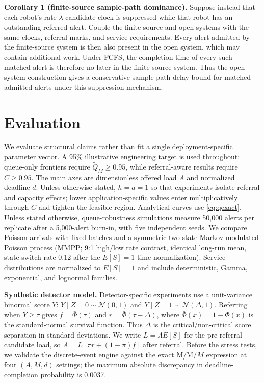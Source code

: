 \documentclass[letterpaper,10pt,conference]{ieeeconf}
\begin{document}
\textbf{Corollary 1 (finite-source sample-path dominance).}
Suppose instead that each robot's rate-$\lambda$ candidate clock is suppressed
while that robot has an outstanding referred alert. Couple the finite-source
and open systems with the same clocks, referral marks, and service requirements.
Every alert admitted by the finite-source system is then also present in the
open system, which may contain additional work. Under FCFS, the completion
time of every such matched alert is therefore no later in the finite-source
system. Thus the open-system construction gives a conservative sample-path
delay bound for matched admitted alerts under this suppression mechanism.

\section{Evaluation}
\label{sec:evaluation}

We evaluate structural claims rather than fit a single deployment-specific parameter vector. A 95\% illustrative engineering target is used throughout: queue-only frontiers require \(\widetilde Q_M\ge0.95\), while referral-aware results require \(C\ge0.95\). The main axes are dimensionless offered load \(A\) and normalized deadline \(d\). Unless otherwise stated, \(h=a=1\) so that experiments isolate referral and capacity effects; lower application-specific values enter multiplicatively through \(C\) and tighten the feasible region. Analytical curves use \eqref{eq:qexact}. Unless stated otherwise, queue-robustness simulations measure 50,000 alerts per replicate after a 5,000-alert burn-in, with five independent seeds. We compare Poisson arrivals with fixed batches and a symmetric two-state Markov-modulated Poisson process (MMPP; 9:1 high/low rate contrast, identical long-run mean, state-switch rate 0.12 after the \(E[S]=1\) time normalization). Service distributions are normalized to \(E[S]=1\) and include deterministic, Gamma, exponential, and lognormal families.

\textbf{Synthetic detector model.} Detector-specific experiments use a unit-variance binormal score \(Y\): \(Y\mid Z=0\sim\mathcal N(0,1)\) and \(Y\mid Z=1\sim\mathcal N(\Delta,1)\). Referring when \(Y\ge\tau\) gives \(f=\bar\Phi(\tau)\) and \(r=\bar\Phi(\tau-\Delta)\), where \(\bar\Phi(x)=1-\Phi(x)\) is the standard-normal survival function. Thus \(\Delta\) is the critical/non-critical score separation in standard deviations. We write \(L=\Lambda E[S]\) for the pre-referral candidate load, so \(A=L[\pi r+(1-\pi)f]\) after referral. Before the stress tests, we validate the discrete-event engine against the exact M/M/\(M\) expression at four \((A,M,d)\) settings; the maximum absolute discrepancy in deadline-completion probability is 0.0037.
\end{document}
